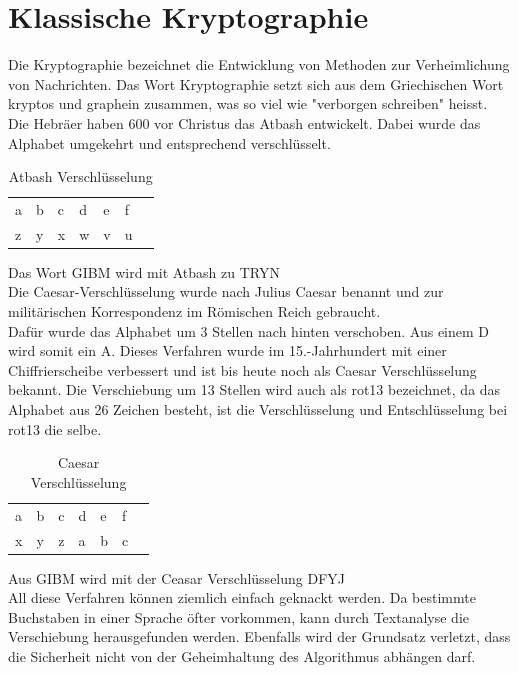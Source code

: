 \section{Klassische Kryptographie}
Die Kryptographie bezeichnet die Entwicklung von Methoden zur Verheimlichung von Nachrichten. Das Wort Kryptographie setzt sich aus dem Griechischen Wort kryptos und graphein zusammen, was so viel wie "verborgen schreiben" heisst.  \cite{kryptographie_Grundlagen} \\
Die Hebräer haben 600 vor Christus das Atbash entwickelt. Dabei wurde das Alphabet umgekehrt und entsprechend verschlüsselt. \\
%
\begin{table}[ht]
\caption{Atbash Verschlüsselung}
\begin{center}
\begin{tabular}{|l|l|l|l|l|l|l|}
  a & b & c & d & e & f\\
  z & y & x & w & v & u\\
\end{tabular}
\end{center}
\end{table}
%
Das Wort GIBM wird mit Atbash zu TRYN \\
Die Caesar-Verschlüsselung wurde nach Julius Caesar benannt und zur militärischen Korrespondenz im Römischen Reich gebraucht.\\
Dafür wurde das Alphabet um 3 Stellen nach hinten verschoben. Aus einem D wird somit ein A. Dieses Verfahren wurde im 15.-Jahrhundert mit einer Chiffrierscheibe verbessert und ist bis heute noch als Caesar Verschlüsselung bekannt. Die Verschiebung um 13 Stellen wird auch als rot13 bezeichnet, da das Alphabet aus 26 Zeichen besteht, ist die Verschlüsselung und Entschlüsselung bei rot13 die selbe. \\

\begin{table}[ht]
\caption{Caesar Verschlüsselung}
\begin{center}
\begin{tabular}{|l|l|l|l|l|l|l|}
  a & b & c & d & e & f\\
  x & y & z & a & b & c\\
\end{tabular}
\end{center}
\end{table}
Aus GIBM wird mit der Ceasar Verschlüsselung DFYJ \\
%
All diese Verfahren können ziemlich einfach geknackt werden. Da bestimmte Buchstaben in einer Sprache öfter vorkommen, kann durch Textanalyse die Verschiebung herausgefunden werden. Ebenfalls wird der Grundsatz verletzt, dass die Sicherheit nicht von der Geheimhaltung des Algorithmus abhängen darf. \cite{kerckhoffsprinzip}
%
%
